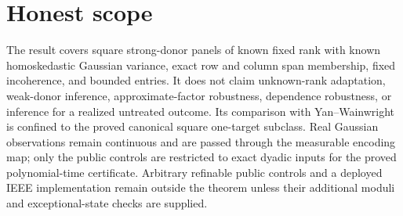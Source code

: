 \documentclass{article}
\begin{document}
\section{Honest scope}

The result covers square strong-donor panels of known fixed rank with known homoskedastic Gaussian variance, exact row and column span membership, fixed incoherence, and bounded entries. It does not claim unknown-rank adaptation, weak-donor inference, approximate-factor robustness, dependence robustness, or inference for a realized untreated outcome. Its comparison with Yan--Wainwright is confined to the proved canonical square one-target subclass. Real Gaussian observations remain continuous and are passed through the measurable encoding map; only the public controls are restricted to exact dyadic inputs for the proved polynomial-time certificate. Arbitrary refinable public controls and a deployed IEEE implementation remain outside the theorem unless their additional moduli and exceptional-state checks are supplied.
\end{document}
